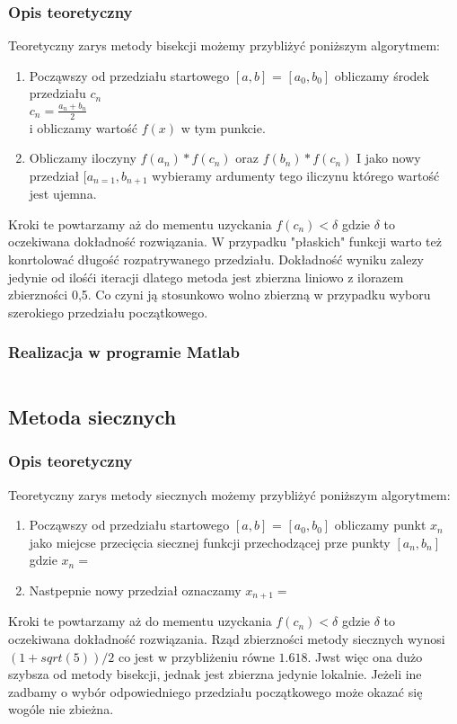 \documentclass[a4paper, 11pt]{article}
\begin{document}
\subsubsection{Opis teoretyczny}
Teoretyczny zarys metody bisekcji możemy przybliżyć poniższym algorytmem:
\begin{enumerate}
  \item Począwszy od przedziału startowego $[a,b]$ = $[a_{0},b_{0}]$ obliczamy środek przedziału $c_{n}$\\
  $c_{n} = \frac{a_{n}+b_{n}}{2}$\\
  i obliczamy wartość $f(x)$ w tym punkcie. 
  \item Obliczamy iloczyny $f(a_{n})*f(c_{n})$ oraz $f(b_{n})*f(c_{n})$ I jako nowy przedział $[a_{n=1},b_{n+1}$
  wybieramy ardumenty tego iliczynu którego wartość jest ujemna. 
\end{enumerate} 
Kroki te powtarzamy aż do mementu uzyckania $f(c_{n})<\delta$ gdzie $\delta$ to oczekiwana dokładność rozwiązania. W przypadku "płaskich" funkcji warto też konrtolować długość rozpatrywanego przedziału. 
Dokładność wyniku zalezy jedynie od ilośći iteracji dlatego metoda jest zbierzna liniowo z ilorazem zbierzności 0,5. Co czyni ją stosunkowo wolno zbierzną w przypadku wyboru szerokiego przedziału początkowego. 



\subsubsection{Realizacja w programie Matlab}
\begin{lstlisting}

\end{lstlisting}

\subsection{Metoda siecznych}
\subsubsection{Opis teoretyczny}
Teoretyczny zarys metody siecznych możemy przybliżyć poniższym algorytmem:
\begin{enumerate}
  \item Począwszy od przedziału startowego $[a,b]$ = $[a_{0},b_{0}]$ obliczamy punkt $x_{n}$ jako miejcse przecięcia siecznej funkcji przechodzącej prze punkty $[a_{n},b_{n}]$ gdzie $x_{n}=$
  \item Nastpepnie nowy przedział oznaczamy $x_{n+1}=$ 
\end{enumerate} 
Kroki te powtarzamy aż do mementu uzyckania $f(c_{n})<\delta$ gdzie $\delta$ to oczekiwana dokładność rozwiązania. Rząd zbierzności metody siecznych wynosi $(1+sqrt(5))/2$ co jest w przybliżeniu równe $1.618$. 
Jwst więc ona dużo szybsza od metody bisekcji, jednak jest zbierzna jedynie lokalnie. Jeżeli ine zadbamy o wybór odpowiedniego przedziału początkowego może okazać się wogóle nie zbieżna. 
\end{document}
